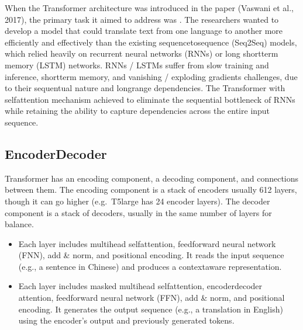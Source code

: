 \documentclass[letterpaper,11pt,english]{sphinxmanual}
\begin{document}
\sphinxAtStartPar
When the Transformer architecture was introduced in the paper
 (Vaswani et al., 2017), the primary task
it aimed to address was . The researchers wanted
to develop a model that could translate text from one language to
another more efficiently and effectively than the existing
sequence\sphinxhyphen{}to\sphinxhyphen{}sequence (Seq2Seq) models, which relied heavily on recurrent
neural networks (RNNs) or long short\sphinxhyphen{}term memory (LSTM) networks. RNNs /
LSTMs suffer from slow training and inference, short\sphinxhyphen{}term memory, and
vanishing / exploding gradients challenges, due to their sequentual
nature and long\sphinxhyphen{}range dependencies. The Transformer with self\sphinxhyphen{}attention
mechanism achieved to eliminate the sequential bottleneck of RNNs while
retaining the ability to capture dependencies across the entire input
sequence.


\subsection{Encoder\sphinxhyphen{}Decoder}
\label{\detokenize{pretraining:encoder-decoder}}
\sphinxAtStartPar
Transformer has an encoding component, a decoding component, and
connections between them. The encoding component is a stack of encoders
\sphinxhyphen{} usually 6\sphinxhyphen{}12 layers, though it can go higher (e.g. T5\sphinxhyphen{}large has 24
encoder layers). The decoder component is a stack of decoders, usually
in the same number of layers for balance.
\begin{itemize}
\item {} 
\sphinxAtStartPar
Each  layer includes multi\sphinxhyphen{}head self\sphinxhyphen{}attention, feedforward
neural network (FNN), add \& norm, and positional encoding. It reads
the input sequence (e.g., a sentence in Chinese) and produces a
context\sphinxhyphen{}aware representation.

\item {} 
\sphinxAtStartPar
Each  layer includes masked multi\sphinxhyphen{}head self\sphinxhyphen{}attention,
encoder\sphinxhyphen{}decoder attention, feedforward neural network (FFN), add \&
norm, and positional encoding. It generates the output sequence (e.g.,
a translation in English) using the encoder’s output and previously
generated tokens.

\end{itemize}
\end{document}
